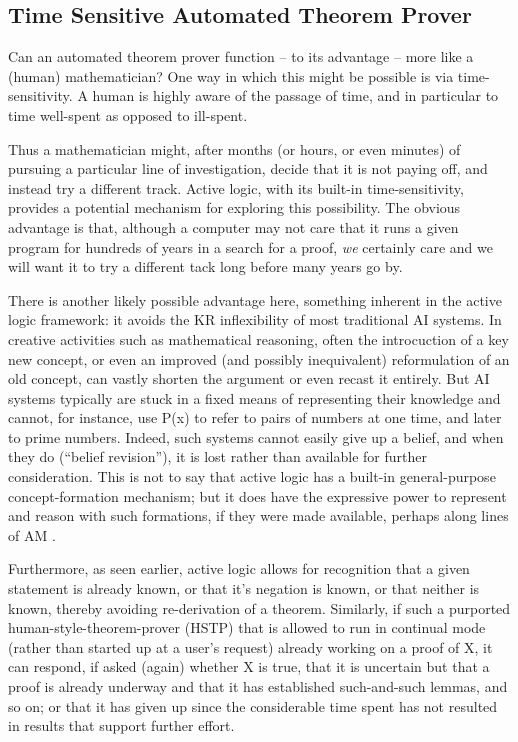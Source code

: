 
\subsection{Time Sensitive Automated Theorem Prover}
Can an automated theorem prover function -- to its advantage -- more
like a (human) mathematician?  One way in which this might be possible
is via time-sensitivity.  A human is highly aware of the passage of
time, and in particular to time well-spent as opposed to ill-spent. 

Thus a mathematician might, after months (or hours, or even minutes)
of pursuing a particular line of investigation, decide that it is not
paying off, and instead try a different track.  Active logic, with its
built-in time-sensitivity, provides a potential mechanism for
exploring this possibility. The obvious advantage is that, although a
computer may not care that it runs a given program for hundreds of
years in a search for a proof, {\em we} certainly care and we will
want it to try a different tack long before many years go by.

There is another likely possible advantage here, something inherent in
the active logic framework: it avoids the KR inflexibility of most
traditional AI systems. In creative activities such as mathematical
reasoning, often the introcuction of a key new concept, or even an
improved (and possibly inequivalent) reformulation of an old concept,
can vastly shorten the argument or even recast it entirely. But AI
systems typically are stuck in a fixed means of representing their
knowledge and cannot, for instance, use P(x) to refer to pairs of
numbers at one time, and later to prime numbers. Indeed, such systems
cannot easily give up a belief, and when they do (``belief
revision''), it is lost rather than available for further
consideration. This is not to say that active logic has a built-in
general-purpose concept-formation mechanism; but it does have the
expressive power to represent and reason with such formations, if they
were made available, perhaps along lines of AM \cite{lenat...}.

Furthermore, as seen earlier, active logic allows for recognition that
a given 
statement is already known, or that it's negation is known, or that
neither is known, thereby avoiding re-derivation of a theorem.
Similarly, if such a purported human-style-theorem-prover (HSTP) that
is allowed to run in continual mode (rather than started up at a
user's request) already working on a proof of X, it can respond, if
asked (again) whether X is true, that it is uncertain but that a proof
is already underway and that it has established such-and-such lemmas,
and so on; or that it has given up since the considerable time spent
has not resulted in results that support further effort.

